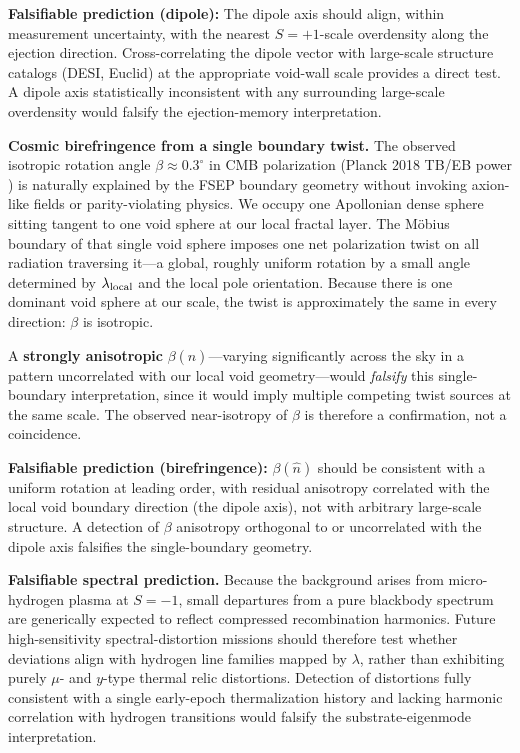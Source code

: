 \documentclass[11pt,letterpaper]{article}
\begin{document}
\textbf{Falsifiable prediction (dipole):} The dipole axis should align, within
measurement uncertainty, with the nearest $S{=}+1$-scale overdensity along the
ejection direction. Cross-correlating the dipole vector with large-scale structure
catalogs (DESI, Euclid) at the appropriate void-wall scale provides a direct test.
A dipole axis statistically inconsistent with any surrounding large-scale
overdensity would falsify the ejection-memory interpretation.

\medskip
\noindent\textbf{Cosmic birefringence from a single boundary twist.}
The observed isotropic rotation angle $\beta \approx 0.3^\circ$ in CMB
polarization (Planck 2018 TB/EB power \cite{MinamiKomatsu2020}) is naturally
explained by the FSEP boundary geometry without invoking axion-like fields or
parity-violating physics. We occupy one Apollonian dense sphere sitting tangent to
one void sphere at our local fractal layer. The M\"obius boundary of that single
void sphere imposes one net polarization twist on all radiation traversing
it---a global, roughly uniform rotation by a small angle determined by
$\lambda_{\rm local}$ and the local pole orientation. Because there is one dominant
void sphere at our scale, the twist is approximately the same in every direction:
$\beta$ is isotropic.

A \textbf{strongly anisotropic} $\beta(\hat{n})$---varying significantly across the
sky in a pattern uncorrelated with our local void geometry---would \textit{falsify}
this single-boundary interpretation, since it would imply multiple competing twist
sources at the same scale. The observed near-isotropy of $\beta$ is therefore a
confirmation, not a coincidence.

\textbf{Falsifiable prediction (birefringence):} $\beta(\hat{n})$ should be
consistent with a uniform rotation at leading order, with residual anisotropy
correlated with the local void boundary direction (the dipole axis), not with
arbitrary large-scale structure. A detection of $\beta$ anisotropy orthogonal to or
uncorrelated with the dipole axis falsifies the single-boundary geometry.

\medskip
\noindent\textbf{Falsifiable spectral prediction.}
Because the background arises from micro-hydrogen plasma at $S{=}{-1}$, small
departures from a pure blackbody spectrum are generically expected to reflect
compressed recombination harmonics. Future high-sensitivity spectral-distortion
missions should therefore test whether deviations align with hydrogen line families
mapped by $\lambda$, rather than exhibiting purely $\mu$- and $y$-type thermal
relic distortions. Detection of distortions fully consistent with a single
early-epoch thermalization history and lacking harmonic correlation with hydrogen
transitions would falsify the substrate-eigenmode interpretation.
\end{document}
